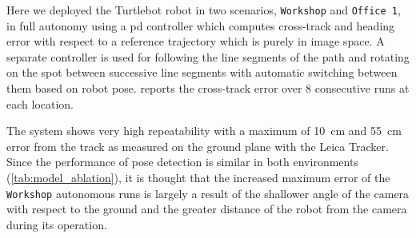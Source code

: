 \documentclass[conference]{ieeeconf}
\newcommand{\gadd}[1] {{\color{magenta} gadd: #1}}
\begin{document}

Here we deployed the Turtlebot robot in two scenarios, \texttt{Workshop} and \texttt{Office 1}, in full autonomy using a \gls{pd} controller which computes cross-track and heading error with respect to a reference trajectory which is purely in image space.
A separate controller is used for following the line segments of the path and rotating on the spot between successive line segments with automatic switching between them based on robot pose.
 reports the cross-track error over $8$ consecutive runs at each location.

The system shows very high repeatability with a maximum of \SI{10}{\centi\metre} and \SI{55}{\centi\metre} error from the track as measured on the ground plane with the Leica Tracker.
Since the performance of pose detection is similar in both environments (\cref{tab:model_ablation}), it is thought that the increased maximum error of the \texttt{Workshop} autonomous runs is largely a result of the shallower angle of the camera with respect to the ground and the greater distance of the robot from the camera during its operation.

 



% 
% 
% 
% 
\end{document}
